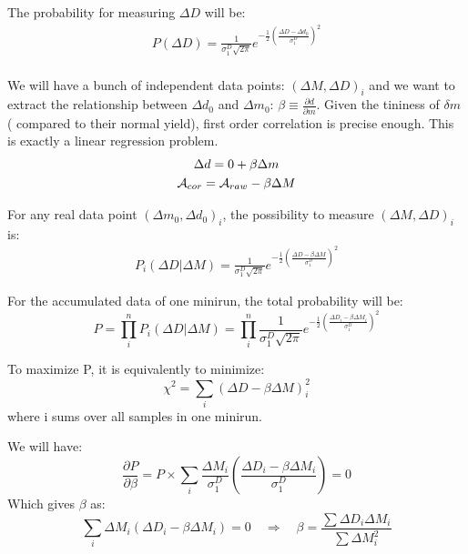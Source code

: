 The probability for measuring $\Delta D$ will be:
\begin{equation*}
    \begin{gathered}
	P(\Delta D) = \frac{1}{\sigma_1^D\sqrt{2\pi}} e^{-\frac{1}{2}\left( \frac{\Delta D - \Delta d_0}{\sigma_1^D}\right)^2}    \\
    \end{gathered}
\end{equation*}

We will have a bunch of independent data points: $(\Delta M, \Delta D)_i$ and 
we want to extract the relationship between $\Delta d_0$ and $\Delta m_0$: 
$\beta \equiv \frac{\partial d}{\partial m}$. Given the tininess of $\delta m$ (
compared to their normal yield), first order correlation is precise enough. 
This is exactly a linear regression problem.
\begin{equation}
    \begin{gathered}
	\Delta d = 0 + \beta \Delta m	\\
	\mathcal{A}_{cor} = \mathcal{A}_{raw} - \beta\Delta M	\\
    \end{gathered}
\end{equation}

For any real data point $(\Delta m_0, \Delta d_0)_i$, the possibility to measure
$(\Delta M, \Delta D)_i$ is:
\begin{equation}
    \begin{gathered}
	P_i(\Delta D|\Delta M) = \frac{1}{\sigma_1^D\sqrt{2\pi}} 
	    e^{-\frac{1}{2}\left( \frac{\Delta D - \beta\Delta M}{\sigma_1^D}\right)^2}
    \end{gathered}
\end{equation}

For the accumulated data of one minirun, the total probability will be:
\begin{equation}
    P = \prod_i^n P_i(\Delta D|\Delta M) = \prod_i^n \frac{1}{\sigma_1^D\sqrt{2\pi}} 
	    e^{-\frac{1}{2}\left( \frac{\Delta D_i - \beta\Delta M_i}{\sigma_1^D}\right)^2}
\end{equation}

To maximize P, it is equivalently to minimize:
\begin{equation}
    \chi^2 = \sum_i (\Delta D - \beta\Delta M)_i^2
    \label{eqn:regression_chi2}
\end{equation}
where i sums over all samples in one minirun.

We will have:
\begin{equation}
    \frac{\partial P}{\partial \beta} = P \times 
    \sum_i \frac{\Delta M_i}{\sigma_1^D} \left( \frac{\Delta D_i - \beta\Delta M_i}{\sigma_1^D}\right)
    = 0
\end{equation}
Which gives $\beta$ as:
\begin{equation}
    \sum_i \Delta M_i (\Delta D_i - \beta\Delta M_i) = 0  \quad \Rightarrow \quad
    \beta = \frac{\sum \Delta D_i \Delta M_i}{\sum \Delta M^2_i}
\end{equation}

